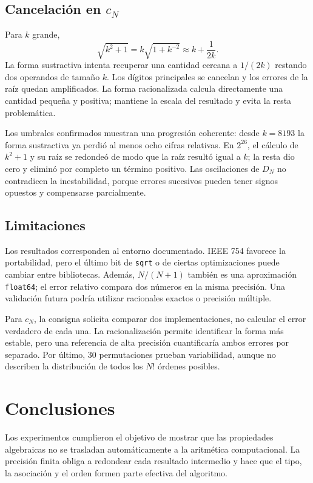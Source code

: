 \documentclass[11pt,a4paper]{article}
\newcommand{\codigo}[1]{\texttt{#1}}
\begin{document}
\subsection{Cancelación en \texorpdfstring{$c_N$}{cN}}

Para $k$ grande,
\begin{equation}
\sqrt{k^2+1}=k\sqrt{1+k^{-2}}\approx k+\frac{1}{2k}.
\end{equation}
La forma sustractiva intenta recuperar una cantidad cercana a $1/(2k)$ restando dos operandos de tamaño $k$. Los dígitos principales se cancelan y los errores de la raíz quedan amplificados. La forma racionalizada calcula directamente una cantidad pequeña y positiva; mantiene la escala del resultado y evita la resta problemática.

Los umbrales confirmados muestran una progresión coherente: desde $k=8193$ la forma sustractiva ya perdió al menos ocho cifras relativas. En $2^{26}$, el cálculo de $k^2+1$ y su raíz se redondeó de modo que la raíz resultó igual a $k$; la resta dio cero y eliminó por completo un término positivo. Las oscilaciones de $D_N$ no contradicen la inestabilidad, porque errores sucesivos pueden tener signos opuestos y compensarse parcialmente.

\subsection{Limitaciones}

Los resultados corresponden al entorno documentado. IEEE 754 favorece la portabilidad, pero el último bit de \codigo{sqrt} o de ciertas optimizaciones puede cambiar entre bibliotecas. Además, $N/(N+1)$ también es una aproximación \codigo{float64}; el error relativo compara dos números en la misma precisión. Una validación futura podría utilizar racionales exactos o precisión múltiple.

Para $c_N$, la consigna solicita comparar dos implementaciones, no calcular el error verdadero de cada una. La racionalización permite identificar la forma más estable, pero una referencia de alta precisión cuantificaría ambos errores por separado. Por último, 30 permutaciones prueban variabilidad, aunque no describen la distribución de todos los $N!$ órdenes posibles.

\section{Conclusiones}

Los experimentos cumplieron el objetivo de mostrar que las propiedades algebraicas no se trasladan automáticamente a la aritmética computacional. La precisión finita obliga a redondear cada resultado intermedio y hace que el tipo, la asociación y el orden formen parte efectiva del algoritmo.
\end{document}
